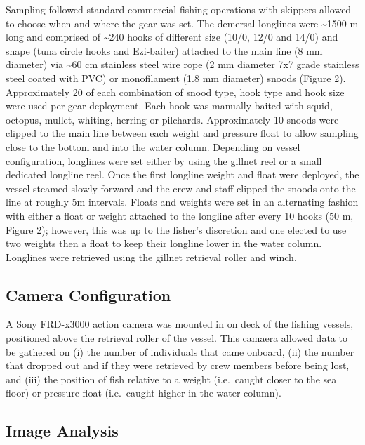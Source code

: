 \documentclass[preprint, 3p,
authoryear]{elsarticle} %
\begin{document}
Sampling followed standard commercial fishing operations with skippers
allowed to choose when and where the gear was set. The demersal
longlines were \textasciitilde1500 m long and comprised of
\textasciitilde240 hooks of different size (10/0, 12/0 and 14/0) and
shape (tuna circle hooks and Ezi-baiter) attached to the main line (8 mm
diameter) via \textasciitilde60 cm stainless steel wire rope (2 mm
diameter 7x7 grade stainless steel coated with PVC) or monofilament (1.8
mm diameter) snoods (Figure 2). Approximately 20 of each combination of
snood type, hook type and hook size were used per gear deployment. Each
hook was manually baited with squid, octopus, mullet, whiting, herring
or pilchards. Approximately 10 snoods were clipped to the main line
between each weight and pressure float to allow sampling close to the
bottom and into the water column. Depending on vessel configuration,
longlines were set either by using the gillnet reel or a small dedicated
longline reel. Once the first longline weight and float were deployed,
the vessel steamed slowly forward and the crew and staff clipped the
snoods onto the line at roughly 5m intervals. Floats and weights were
set in an alternating fashion with either a float or weight attached to
the longline after every 10 hooks (50 m, Figure 2); however, this was up
to the fisher's discretion and one elected to use two weights then a
float to keep their longline lower in the water column. Longlines were
retrieved using the gillnet retrieval roller and winch.

\hypertarget{camera-configuration}{%
\subsection{Camera Configuration}\label{camera-configuration}}

A Sony FRD-x3000 action camera was mounted in on deck of the fishing
vessels, positioned above the retrieval roller of the vessel. This
camaera allowed data to be gathered on (i) the number of individuals
that came onboard, (ii) the number that dropped out and if they were
retrieved by crew members before being lost, and (iii) the position of
fish relative to a weight (i.e.~caught closer to the sea floor) or
pressure float (i.e.~caught higher in the water column).

\hypertarget{image-analysis}{%
\subsection{Image Analysis}\label{image-analysis}}
\end{document}
